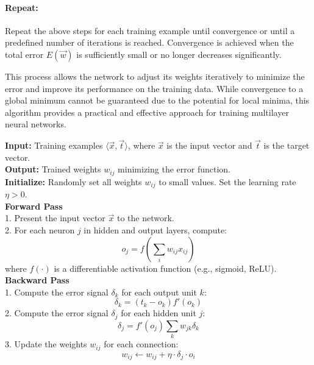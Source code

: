 \documentclass{article}
\begin{document}
\paragraph{Repeat:}
Repeat the above steps for each training example until convergence or until a predefined number of iterations is reached. Convergence is achieved when the total error $E(\Vec{w})$ is sufficiently small or no longer decreases significantly.

This process allows the network to adjust its weights iteratively to minimize the error and improve its performance on the training data. While convergence to a global minimum cannot be guaranteed due to the potential for local minima, this algorithm provides a practical and effective approach for training multilayer neural networks.

\begin{algorithm}[h]
    \caption{Backpropagation Algorithm}
        \textbf{Input:} Training examples $\langle \Vec{x}, \Vec{t} \rangle$, where $\Vec{x}$ is the input vector and $\Vec{t}$ is the target vector. \\
        \textbf{Output:} Trained weights $w_{ij}$ minimizing the error function. \\
        \textbf{Initialize:} Randomly set all weights $w_{ij}$ to small values. Set the learning rate $\eta > 0$. \\
        
        \textbf{Forward Pass} \\
        1. Present the input vector $\Vec{x}$ to the network. \\
        2. For each neuron $j$ in hidden and output layers, compute: \\
        \begin{equation*}
            o_j = f\left(\sum_i w_{ij} x_{ij}\right)
        \end{equation*}
        where $f(\cdot)$ is a differentiable activation function (e.g., sigmoid, ReLU). \\
        
        \textbf{Backward Pass} \\
        1. Compute the error signal $\delta_k$ for each output unit $k$: \\
        \begin{equation*}
            \delta_k = (t_k - o_k) f'(o_k)
        \end{equation*}
        2. Compute the error signal $\delta_j$ for each hidden unit $j$: \\
        \begin{equation*}
            \delta_j = f'(o_j) \sum_k w_{jk} \delta_k
        \end{equation*}
        3. Update the weights $w_{ij}$ for each connection: \\
        \begin{equation*}
            w_{ij} \leftarrow w_{ij} + \eta \cdot \delta_j \cdot o_i
        \end{equation*}


\end{algorithm}
\end{document}
